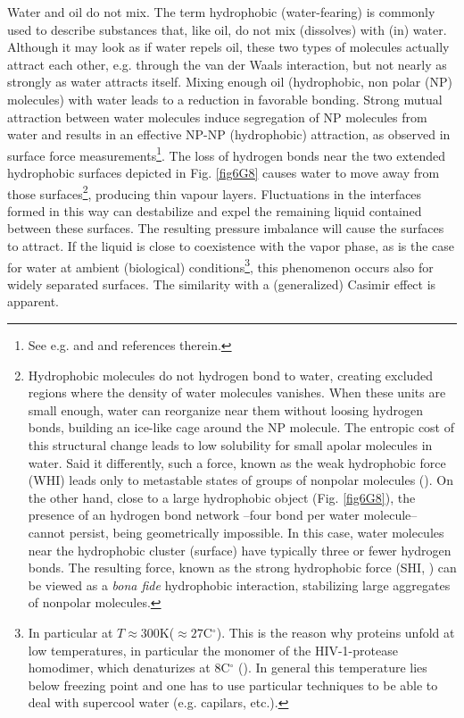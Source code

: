 \begin{subappendices}
Water and oil do not mix. The term hydrophobic (water-fearing) is commonly used to describe substances that, like oil, do not mix (dissolves) with (in) water. Although it may look as if water repels oil, these two types of molecules actually attract each other, e.g. through the van der Waals interaction, but not nearly as strongly as water attracts itself. Mixing enough oil (hydrophobic, non polar (NP) molecules) with water leads to a reduction in favorable bonding. Strong mutual attraction between water molecules induce segregation of NP molecules from water and results in an effective NP-NP (hydrophobic) attraction, as observed  in surface force measurements\footnote{See e.g. \cite{Chandler:02,Chandler:05} and \cite{Lum:99} and references therein.}. The loss of hydrogen bonds near the two extended hydrophobic surfaces depicted in Fig. \ref{fig6G8} causes water to move away from those surfaces\footnote{Hydrophobic molecules do not hydrogen bond to water, creating excluded regions where the density of water molecules vanishes. When these units are small enough, water can reorganize near them without loosing hydrogen bonds, building an ice-like cage around the NP molecule. The entropic cost of this structural change leads to low solubility for small apolar molecules in water. Said it differently, such a force, known as the weak hydrophobic force (WHI) leads only to metastable states of groups of nonpolar molecules (\cite{Chandler:02}). On the other hand, close to a large hydrophobic object (Fig. \ref{fig6G8}), the presence of an hydrogen bond network --four bond per water molecule-- cannot persist, being geometrically impossible. In this case, water molecules near the hydrophobic cluster (surface) have typically three or fewer hydrogen bonds. The resulting force, known as the strong hydrophobic force (SHI, \cite{Chandler:02}) can be viewed as a \textit{bona fide} hydrophobic interaction, stabilizing large aggregates of nonpolar molecules.}, producing thin vapour layers. Fluctuations in the interfaces formed in this way can destabilize and expel the remaining liquid contained between these surfaces. The resulting pressure imbalance will cause the surfaces to attract. If the liquid is close to coexistence with the vapor phase, as is the case for water at ambient (biological) conditions\footnote{In particular at $T\approx300$K($\approx 27$C$^\circ$). This is the reason why proteins unfold at low temperatures, in particular the monomer of the HIV-1-protease homodimer, which denaturizes at 8C$^\circ$ (\cite{Rosner:17}). In general this temperature lies below freezing point and one has to use particular techniques to be able to deal with supercool water (e.g. capilars, etc.).}, this phenomenon occurs also for widely separated surfaces. The similarity with a (generalized) Casimir effect is apparent. 



\end{subappendices}
